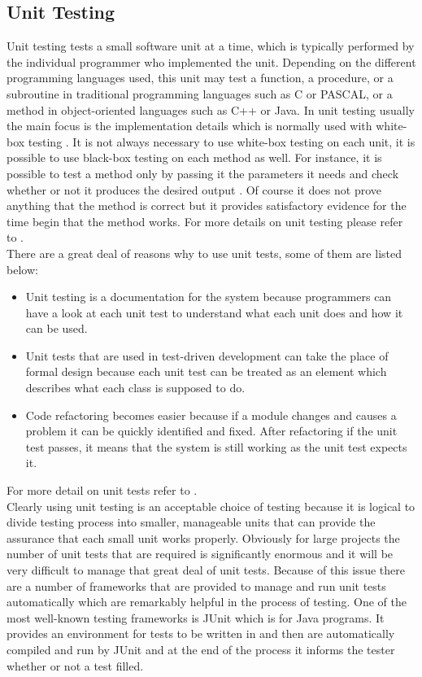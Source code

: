 \documentclass[10pt, a4paper, titlepage]{article}
\begin{document}
\subsection{Unit Testing}
Unit testing tests a small software unit at a time, which is typically performed by the individual programmer who implemented the unit. Depending on the different programming
languages used, this unit may test a function, a procedure, or a subroutine in traditional programming languages such as C or PASCAL, or a method in object-oriented languages such as C++ or Java. In unit testing usually the main focus is the implementation details which is normally used with white-box testing \cite{unittesting_book}. It is not always necessary to use white-box testing on each unit, it is possible to use black-box testing on each method as well. For instance, it is possible to test a method only by passing it the parameters it needs and check whether or not it produces the desired output \cite{unittesting_book}. Of course it does not prove anything that the method is correct but it provides satisfactory evidence for the time begin that the method works. For more details on unit testing please refer to \cite{unittesting_book}.\\
There are a great deal of reasons why to use unit tests, some of them are listed below:

\begin{itemize}
\item Unit testing is a documentation for the system because programmers can have a look at each unit test to understand what each unit does and how it can be used.
\item Unit tests that are used in test-driven development can take the place of formal design because each unit test can be treated as an element which describes what each class is supposed to do.
\item Code refactoring becomes easier because if a module changes and causes a problem it can be quickly identified and fixed. After refactoring if the unit test passes, it means that the system is still working as the unit test expects it.
\end{itemize}
For more detail on unit tests refer to \cite{KentBeck_site}.\\

Clearly using unit testing is an acceptable choice of testing because it is logical to divide testing process into smaller, manageable units that can provide the assurance that each small unit works properly. Obviously for large projects the number of unit tests that are required is significantly enormous and it will be very difficult to manage that great deal of unit tests. Because of this issue there are a number of frameworks that are provided to manage and run unit tests automatically which are remarkably helpful in the process of testing. One of the most well-known testing frameworks is JUnit which is for Java programs. It provides an environment for tests to be written in and then are automatically compiled and run by JUnit and at the end of the process it informs the tester whether or not a test filled. \\
\end{document}
